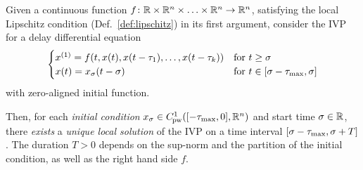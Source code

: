     \begin{theorem}
        \label{thm:solution-existence}
        Given a continuous function $f\colon\mathbb{R}\times\mathbb{R}^n\times\ldots\times\mathbb{R}^n\to\mathbb{R}^n$, satisfying the local Lipschitz condition (Def.~\ref{def:lipschitz}) in its first argument, consider the IVP for a delay differential equation
        \begin{equation}
            \begin{cases}
                \D{x} = f(t,x(t),x(t-\tau_1),\ldots,x(t-\tau_k)) & \text{for } t\geq\tzero\\
                x(t) = x_\tzero(t-\tzero) & \text{for } t\in\compactum{\tzero-\taumax}{\tzero}
            \end{cases}
        \end{equation}
        with zero-aligned initial function.


        Then, for each \emph{initial condition} $x_{\tzero}\in\statespace[-\taumax]$ and start time $\sigma\in\mathbb{R}$, there \emph{exists} a \emph{unique local solution} of the IVP on a time interval $[\sigma-\tau_{\max},\sigma+T]$.
        The duration $T>0$ depends on the sup-norm and the partition of the initial condition, as well as the right hand side $f$.
    \end{theorem}

